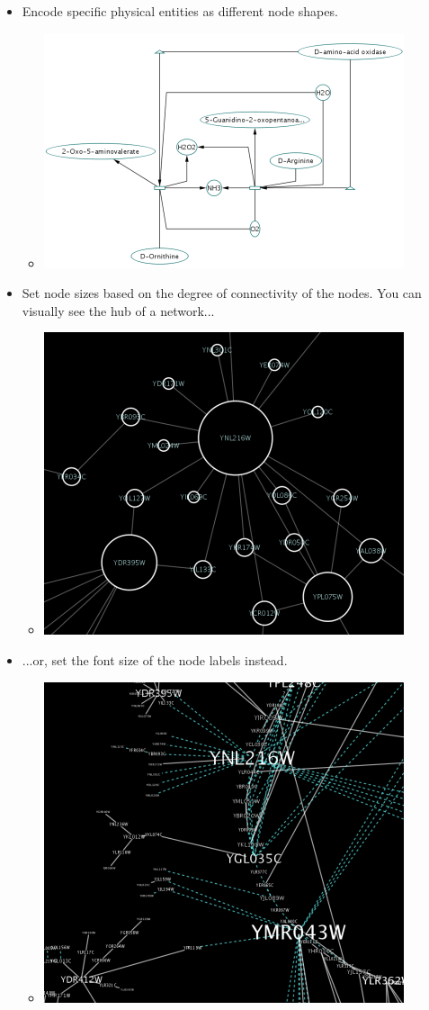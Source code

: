 \begin{itemize}
\begin{itemize}
\end{itemize}

\item Encode specific physical entities as different node shapes. \begin{itemize}
\item 

 \includegraphics[width=.6\textwidth]{images/NodeShapeMapping.png} 


\end{itemize}

\item Set node sizes based on the degree of connectivity of the nodes. You can visually see the hub of a network... \begin{itemize}
\item 

 \includegraphics[width=.6\textwidth]{images/DegreeSize.png} 


\end{itemize}

\item ...or, set the font size of the node labels instead. \begin{itemize}
\item 

 \includegraphics[width=.6\textwidth]{images/DegreeLabelSize.png} 



\end{itemize}
\end{itemize}
